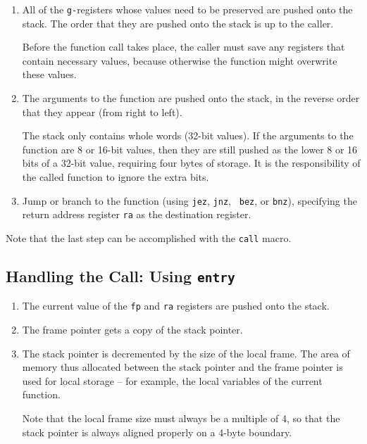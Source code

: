 \begin{enumerate}

\item All of the {\tt g-}registers whose values need to be preserved
	are pushed onto the stack.  The order that they are pushed
	onto the stack is up to the caller.

	Before the function call takes place, the caller must save any
	registers that contain necessary values, because otherwise the
	function might overwrite these values.

\item The arguments to the function are pushed onto the stack, in the
	reverse order that they appear (from right to left).

	The stack only contains whole words (32-bit values).  If the
	arguments to the function are 8 or 16-bit values, then they
	are still pushed as the lower 8 or 16 bits of a 32-bit value,
	requiring four bytes of storage.  It is the responsibility of
	the called function to ignore the extra bits.

\item Jump or branch to the function (using {\tt jez}, {\tt jnz}, {\tt
	bez}, or {\tt bnz}), specifying the return address register
	{\tt ra} as the destination register.

\end{enumerate}

Note that the last step can be accomplished with the {\tt call} macro.

\subsection{Handling the Call: Using {\tt entry}}
\label{reg32-entry-sec}

\begin{enumerate}

\item The current value of the {\tt fp} and {\tt ra} registers
	are pushed onto the stack.

\item The frame pointer gets a copy of the stack pointer.

\item The stack pointer is decremented by the size of the local frame. 
	The area of memory thus allocated between the stack pointer
	and the frame pointer is used for local storage -- for example,
	the local variables of the current function.

	Note that the local frame size must always be a multiple of 4,
	so that the stack pointer is always aligned properly on a
	4-byte boundary.

\end{enumerate}

